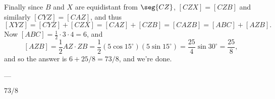 Finally since $B$ and $X$ are equidistant from $\seg{CZ}$, $[CZX]=[CZB]$ and similarly $[CYZ]=[CAZ]$, and thus $$[XYZ]=[CYZ]+[CZX]=[CAZ]+[CZB]=[CAZB]=[ABC]+[AZB].$$
Now $[ABC]=\tfrac12\cdot3\cdot4=6$, and $$[AZB]=\frac12AZ\cdot ZB=\frac12(5\cos15^\circ)(5\sin15^\circ)=\frac{25}4\sin30^\circ=\frac{25}8,$$
and so the answer is $6+25/8=\boxed{73/8}$, and we're done.

---

$73/8$
